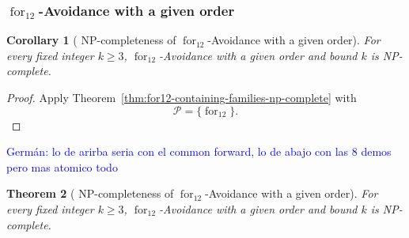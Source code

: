 \documentclass[12pt]{article}
\theoremstyle{plain}
\newtheorem{theorem}{Theorem}[section]
\newtheorem{corollary}[theorem]{Corollary}
\theoremstyle{definition}
\theoremstyle{remark}
\theoremstyle{definition}
\newcommand{\forlabel}{\mathrm{for}}
\DeclareRobustCommand{\forparam}[1]{%
  \ensuremath{\mathop{\forlabel}\nolimits_{#1}}%
}
\newcommand{\german}[1]{%
  \textcolor{blue}{Germán: #1}%
}
\begin{document}
\subsubsection{
\texorpdfstring{\(\forparam{12}\)-Avoidance with a given order}
{for12-Avoidance with a given order}
}
\label{subsubsec:for12-given-order}



\begin{corollary}[
NP-completeness of
\texorpdfstring{\(\forparam{12}\)-Avoidance with a given order}
{for12-Avoidance with a given order}
]
\label{cor:for12-given-order-np-complete}
For every fixed integer \(k\ge3\),
\(\forparam{12}\)-Avoidance with a given order and bound \(k\)
is NP-complete.
\end{corollary}

\begin{proof}
Apply Theorem~\ref{thm:for12-containing-families-np-complete} with
\[
\mathcal P=\{\forparam{12}\}.
\]
\end{proof}
\german{lo de arirba seria con el common forward, lo de abajo
con las 8 demos pero mas atomico todo}


\begin{theorem}[
NP-completeness of
\texorpdfstring{\(\forparam{12}\)-Avoidance with a given order}
{for12-Avoidance with a given order}
]
\label{thm:for12-given-order-np-complete}
For every fixed integer \(k\ge 3\),
\(\forparam{12}\)-Avoidance with a given order and bound \(k\)
is NP-complete.
\end{theorem}
\end{document}
